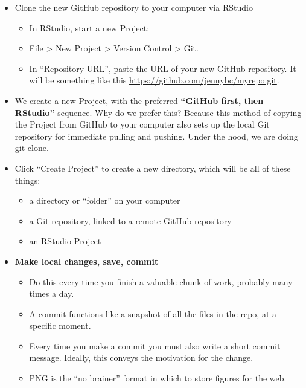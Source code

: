 \documentclass[
]{article}
\providecommand{\tightlist}{%
  \setlength{\itemsep}{0pt}\setlength{\parskip}{0pt}}
\begin{document}
\begin{itemize}
  \begin{itemize}
  \tightlist
  \item
  \end{itemize}
\item
  Clone the new GitHub repository to your computer via RStudio

  \begin{itemize}
  \tightlist
  \item
    In RStudio, start a new Project:
  \item
    File \textgreater{} New Project \textgreater{} Version Control \textgreater{} Git.
  \item
    In ``Repository URL'', paste the URL of your new GitHub
    repository. It will be something like this
    \url{https://github.com/jennybc/myrepo.git}.
  \end{itemize}
\item
  We create a new Project, with the preferred \textbf{``GitHub first, then
  RStudio''} sequence. Why do we prefer this? Because this method of
  copying the Project from GitHub to your computer also sets up the
  local Git repository for immediate pulling and pushing. Under the
  hood, we are doing git clone.
\item
  Click ``Create Project'' to create a new directory, which will be all
  of these things:

  \begin{itemize}
  \tightlist
  \item
    a directory or ``folder'' on your computer
  \item
    a Git repository, linked to a remote GitHub repository
  \item
    an RStudio Project
  \end{itemize}
\item
  \textbf{Make local changes, save, commit}

  \begin{itemize}
  \tightlist
  \item
    Do this every time you finish a valuable chunk of work, probably
    many times a day.
  \item
    A commit functions like a snapshot of all the files in the repo,
    at a specific moment.
  \item
    Every time you make a commit you must also write a short commit
    message. Ideally, this conveys the motivation for the change.
  \item
    PNG is the ``no brainer'' format in which to store figures for the
    web.
  \end{itemize}
\end{itemize}
\end{document}
